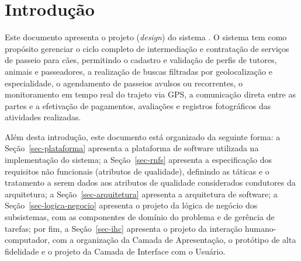\chapter{Introdução}
\label{sec-intro}
\vspace{-1cm}

Este documento apresenta o projeto (\textit{design}) do sistema \emph{\imprimirtitulo}. O sistema tem como propósito gerenciar o ciclo completo de intermediação e contratação de serviços de
passeio para cães, permitindo o cadastro e validação de perfis de tutores, animais e passeadores, a realização de buscas filtradas por geolocalização e especialidade, o agendamento de passeios avulsos ou recorrentes, o monitoramento em tempo real do trajeto via GPS, a comunicação direta entre as partes e a efetivação de pagamentos, avaliações e registros fotográficos das atividades realizadas. 


Além desta introdução, este documento está organizado da seguinte forma: 
	a Seção~\ref{sec-plataforma} apresenta a plataforma de software utilizada na implementação do sistema;
	a Seção~\ref{sec-rnfs} apresenta a especificação dos requisitos não funcionais (atributos de qualidade), definindo as táticas e o tratamento a serem dados aos atributos de qualidade considerados condutores da arquitetura; 
	a Seção~\ref{sec-arquitetura} apresenta a arquitetura de software; 
	a Seção~\ref{sec-logica-negocio} apresenta o projeto da lógica de negócio dos subsistemas, com as componentes de domínio do problema e de gerência de tarefas; por fim, 
	a Seção~\ref{sec-ihc} apresenta o projeto da interação humano-computador, com a organização da Camada de Apresentação, o protótipo de alta fidelidade e o projeto da Camada de Interface com o Usuário.

